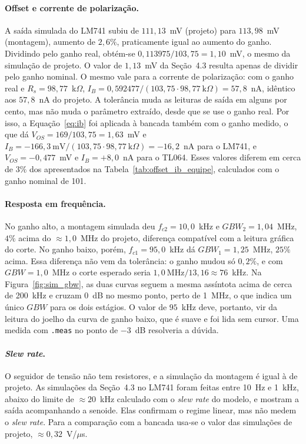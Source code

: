 \documentclass[11pt,a4paper]{article}
\begin{document}
\paragraph{Offset e corrente de polarização.} A saída simulada do LM741 subiu de $111{,}13$~mV
(projeto) para $113{,}98$~mV (montagem), aumento de $2{,}6\%$, praticamente igual ao aumento do
ganho. Dividindo pelo ganho real, obtém-se $0{,}113975/103{,}75=1{,}10$~mV, o mesmo da
simulação de projeto. O valor de $1{,}13$~mV da Seção~4.3 resulta apenas de dividir pelo ganho
nominal. O mesmo vale para a corrente de polarização: com o ganho real e $R_s=98{,}77$~k$\Omega$,
$I_B=0{,}592477/(103{,}75\cdot98{,}77~\text{k}\Omega)=57{,}8$~nA, idêntico aos $57{,}8$~nA do
projeto. A tolerância muda as leituras de saída em alguns por cento, mas não muda o parâmetro
extraído, desde que se use o ganho real. Por isso, a Equação~\eqref{eq:ib} foi aplicada à bancada
também com o ganho medido, o que dá $V_{OS}=169/103{,}75=1{,}63$~mV e
$I_B=-166{,}3~\text{mV}/(103{,}75\cdot98{,}77~\text{k}\Omega)=-16{,}2$~nA para o LM741, e
$V_{OS}=-0{,}477$~mV e $I_B=+8{,}0$~nA para o TL064. Esses valores diferem em cerca de $3\%$ dos
apresentados na Tabela~\ref{tab:offset_ib_equipe}, calculados com o ganho nominal de 101.

\paragraph{Resposta em frequência.} No ganho alto, a montagem simulada deu $f_{c2}=10{,}0$~kHz e
$GBW_2=1{,}04$~MHz, $4\%$ acima do $\approx1{,}0$~MHz do projeto, diferença compatível com a leitura
gráfica do corte. No ganho baixo, porém, $f_{c1}=95{,}0$~kHz dá $GBW_1=1{,}25$~MHz, $25\%$ acima.
Essa diferença não vem da tolerância: o ganho mudou só $0{,}2\%$, e com $GBW=1{,}0$~MHz o corte
esperado seria $1{,}0~\text{MHz}/13{,}16\approx76$~kHz. Na Figura~\ref{fig:sim_gbw}, as duas curvas
seguem a mesma assíntota acima de cerca de 200~kHz e cruzam $0$~dB no mesmo ponto, perto de 1~MHz,
o que indica um único $GBW$ para os dois estágios. O valor de $95$~kHz deve, portanto, vir da
leitura do joelho da curva de ganho baixo, que é suave e foi lida sem cursor. Uma medida com
\texttt{.meas} no ponto de $-3$~dB resolveria a dúvida.

\paragraph{\textit{Slew rate}.} O seguidor de tensão não tem resistores, e a simulação da montagem
é igual à de projeto. As simulações da Seção~4.3 no LM741 foram feitas entre 10~Hz e 1~kHz, abaixo
do limite de $\approx20$~kHz calculado com o \textit{slew rate} do modelo, e mostram a saída
acompanhando a senoide. Elas confirmam o regime linear, mas não medem o \textit{slew rate}. Para a
comparação com a bancada usa-se o valor das simulações de projeto, $\approx0{,}32$~V/$\mu$s.
\end{document}
